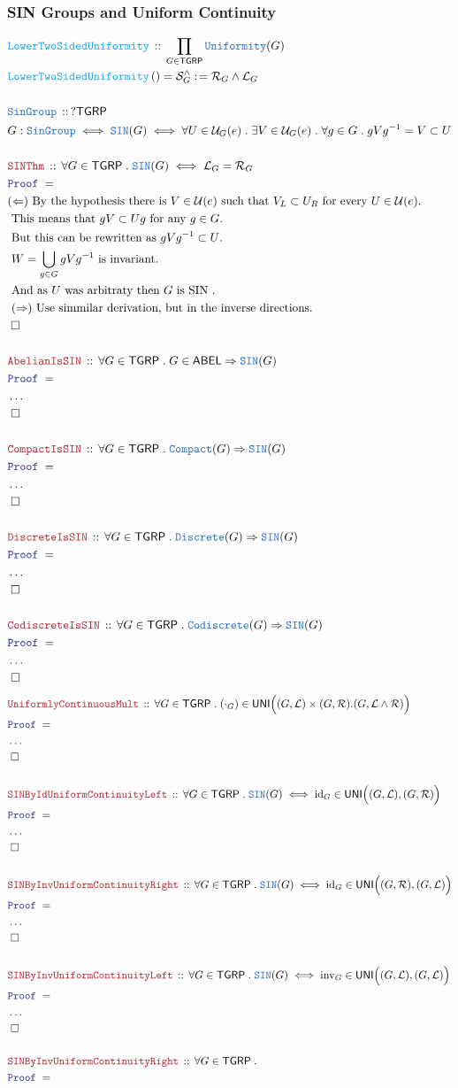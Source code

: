 \documentclass[12pt]{scrartcl}
\newcommand{\TYPE}[1]{\textcolor{NavyBlue}{\mathtt{#1}}}
\newcommand{\FUNC}[1]{\textcolor{Cerulean}{\mathtt{#1}}}
\newcommand{\LOGIC}[1]{\textcolor{Blue}{\mathtt{#1}}}
\newcommand{\THM}[1]{\textcolor{Maroon}{\mathtt{#1}}}
\renewcommand{\.}{\; . \;}
\newcommand{\de}{: \kern 0.1pc =}
\newcommand{\Act}[1]{\left( #1 \right)}
\newcommand{\Theorem}[2]{& \THM{#1} \, :: \, #2 \\ & \Proof = \\ }
\newcommand{\DeclareType}[2]{& \TYPE{#1} \, :: \, #2 \\}
\newcommand{\DefineNamedType}[4]{& #1 : \TYPE{#2} \iff #3 \iff #4 \\}
\newcommand{\DeclareFunc}[2]{& \FUNC{#1} \, :: \, #2 \\}
\newcommand{\DefineNamedFunc}[4]{&  \FUNC{#1}\Act{#2} = #3 \de #4 \\}
\newcommand{\Page}[1]{ \begin{align*} #1 \end{align*}   }
\newcommand{\NoProof}{ & \ldots \\ \EndProof}
\newcommand{\Explain}[1]{& \text{#1.} \\}
\newcommand{\Imply}{\Rightarrow}
\DeclareMathOperator*{\id}{id}
\newcommand{\QED}{\; \square}
\newcommand{\EndProof}{& \QED \\}
\newcommand{\Proof}{\LOGIC{Proof} \; }
\newcommand{\R}{\mathrm{R}}
\newcommand{\Compact}{\TYPE{Compact}}
\renewcommand{\U}{\mathcal{U}}
\newcommand{\UNI}{\mathsf{UNI}}
\renewcommand{\L}{\mathcal{L}}
\renewcommand{\S}{\mathcal{S}}
\newcommand{\ABEL}{\mathsf{ABEL}}
\newcommand{\Unif}{\TYPE{Uniformity}}
\newcommand{\SIN}{\TYPE{SIN}}
\newcommand{\TGRP}{\mathsf{TGRP}}
\renewcommand{\L}{\mathcal{L}}
\renewcommand{\R}{\mathcal{R}}
\renewcommand{\S}{\mathcal{S}}
\begin{document}
\subsubsection{SIN Groups and Uniform Continuity}
\Page{
	\DeclareFunc{LowerTwoSidedUniformity}{\prod_{G \in \TGRP} \Unif(G)}
	\DefineNamedFunc{LowerTwoSidedUniformity}{}{\S_G^\wedge}
	{ \R_G \wedge \L_G  }
	\\
	\DeclareType{SinGroup}{?\TGRP}
	\DefineNamedType{G}{SinGroup}{\TYPE{SIN}(G)}
	{
		\forall U \in \U_G(e) \.
		\exists V \in \U_G(e) \.
		\forall g \in G \.
		gVg^{-1} = V \subset U
	}
	\\
	\Theorem{SINThm}
	{
		\forall G \in \TGRP \. 
		\TYPE{SIN}(G) \iff \L_G = \R_G
	}
	\Explain{$(\Leftarrow)$ 
		By the hypothesis there is $V \in \U(e)$
		such that $V_L \subset U_R$ for every $U \in \U(e)$}
	\Explain{
		This means that $ gV \subset Ug $ for any $g \in G$}
	\Explain{
		But this can be rewritten as $gVg^{-1} \subset U$}
	\Explain{
		$W = \bigcup_{g \in G} gVg^{-1}$ is invariant}
	\Explain{
		And as $U$ was arbitraty then $G$ is SIN
	}
	\Explain{
	$(\Rightarrow)$ 
	Use simmilar derivation, but in the inverse directions}
	\EndProof
	\\
	\Theorem{AbelianIsSIN}
	{
		\forall G \in \TGRP \. G \in \ABEL \Imply \TYPE{SIN}(G) 
	}
	\NoProof
	\\
	\Theorem{CompactIsSIN}
	{
		\forall G \in \TGRP \. \Compact(G) \Imply \TYPE{SIN}(G) 
	}
	\NoProof
	\\
	\Theorem{DiscreteIsSIN}
	{
		\forall G \in \TGRP \. \TYPE{Discrete}(G) \Imply \TYPE{SIN}(G) 
	}
	\NoProof
	\\
	\Theorem{CodiscreteIsSIN}
	{
		\forall G \in \TGRP \. \TYPE{Codiscrete}(G) \Imply \TYPE{SIN}(G) 
	}
	\NoProof
}\Page{
	\Theorem{UniformlyContinuousMult}
	{
		\forall G \in \TGRP \. 
		 (\cdot_G) \in \UNI\Big( (G,\L)\times(G,\R). (G,\L \wedge \R) \Big)
	}
	\NoProof
	\\
	\Theorem{SINByIdUniformContinuityLeft}
	{
		\forall G \in \TGRP \.
		\SIN(G) \iff {\id}_G \in \UNI\Big( (G,\L), (G,\R) \Big)
	}
	\NoProof
	\\
	\Theorem{SINByInvUniformContinuityRight}
	{
		\forall G \in \TGRP \.
		\SIN(G) \iff {\id}_G \in \UNI\Big( (G,\R), (G,\L) \Big)
	}
	\NoProof
	\\
	\Theorem{SINByInvUniformContinuityLeft}
	{
		\forall G \in \TGRP \.
		\SIN(G) \iff {\mathrm{inv}}_G \in \UNI\Big( (G,\L), (G,\L) \Big)
	}
	\NoProof
	\\
	\Theorem{SINByInvUniformContinuityRight}
	{
		\forall G \in \TGRP \.
}}
\end{document}
